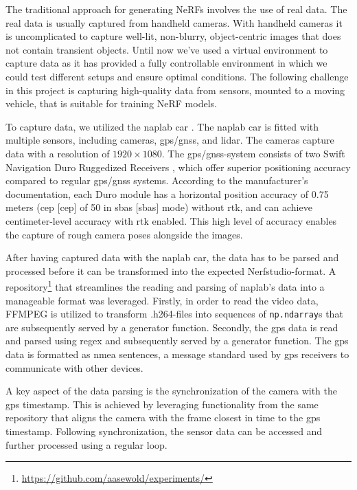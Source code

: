 The traditional approach for generating NeRFs involves the use of real data. The real data is usually captured from handheld cameras. With handheld cameras it is uncomplicated to capture well-lit, non-blurry, object-centric images that does not contain transient objects. Until now we've used a virtual environment to capture data as it has provided a fully controllable environment in which we could test different setups and ensure optimal conditions. The following challenge in this project is capturing high-quality data from sensors, mounted to a moving vehicle, that is suitable for training NeRF models.

To capture data, we utilized the \acrshort{naplab} car \cite{naplab}. The \acrshort{naplab} car is fitted with multiple sensors, including cameras, \acrshort{gps}/\acrshort{gnss}, and \acrshort{lidar}. The cameras capture data with a resolution of $1920 \times 1080$. The \acrshort{gps}/\acrshort{gnss}-system consists of two Swift Navigation Duro Ruggedized Receivers \cite{swift_navigation_duro_manual}, which offer superior positioning accuracy compared to regular \acrshort{gps}/\acrshort{gnss} systems. According to the manufacturer’s documentation, each Duro module has a horizontal position accuracy of 0.75 meters (\acrlong{cep} [\acrshort{cep}] of 50 in \acrlong{sbas} [\acrshort{sbas}] mode) without \acrfull{rtk}, and can achieve centimeter-level accuracy with \acrshort{rtk} enabled. This high level of accuracy enables the capture of rough camera poses alongside the images.

After having captured data with the \acrshort{naplab} car, the data has to be parsed and processed before it can be transformed into the expected Nerfstudio-format. A repository\footnote{\url{https://github.com/aasewold/experiments/}} that streamlines the reading and parsing of \acrshort{naplab}'s data into a manageable format was leveraged. Firstly, in order to read the video data, FFMPEG is utilized to transform .h264-files into sequences of \texttt{np.ndarray}s that are subsequently served by a generator function. Secondly, the \acrshort{gps} data is read and parsed using regex and subsequently served by a generator function. The \acrshort{gps} data is formatted as \acrfull{nmea} sentences, a message standard used by \acrshort{gps} receivers to communicate with other devices. 

A key aspect of the data parsing is the synchronization of the camera with the \acrshort{gps} timestamp. This is achieved by leveraging functionality from the same repository that aligns the camera with the frame closest in time to the \acrshort{gps} timestamp. Following synchronization, the sensor data can be accessed and further processed using a regular loop.

